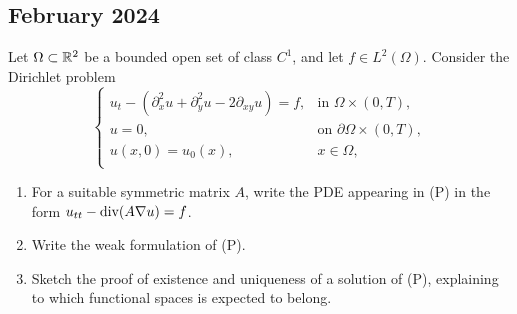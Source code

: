 \subsection{February 2024}
\begin{exercise}
    Let \(\Omega \subset \mathbb{R}^2\) be a bounded open set of class \(C^1\), and let \(f \in L^2(\Omega)\). Consider the Dirichlet problem
    \begin{equation*}
        \begin{cases}
            u_{t} - \left(\partial_x^2 u +  \partial_y^2 u - 2 \partial_{xy} u\right) = f, & \text{in } \Omega \times (0, T),          \\
            u = 0,                                                                         & \text{on } \partial \Omega \times (0, T), \\
            u(x,0) = u_0(x),                                                               & x \in \Omega,                             \\
        \end{cases}
        \tag{(P)}
    \end{equation*}
    \begin{enumerate}
        \item For a suitable symmetric matrix \(A\), write the PDE appearing in (P) in the
              form \(u_{tt} - \text{div}(A \nabla u) = f\).
        \item Write the weak formulation of (P).
        \item Sketch the proof of existence and uniqueness of a solution of (P), explaining
              to which functional spaces is expected to belong.
    \end{enumerate}
\end{exercise}
